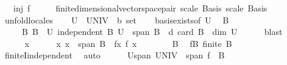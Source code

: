\begin{isabellebody}
\ \ \ {\isachardoublequoteopen}inj\ f{\isachardoublequoteclose}\isanewline
%
\isadelimproof
%
\endisadelimproof
%
\isatagproof
{}\isamarkupfalse%
\ {\isacharminus}{\kern0pt}\isanewline
\ \ \isamarkupfalse%
\ finite{\isacharunderscore}{\kern0pt}dimensional{\isacharunderscore}{\kern0pt}vector{\isacharunderscore}{\kern0pt}space{\isacharunderscore}{\kern0pt}pair\ scale\ Basis\ scale\ Basis\ \isamarkupfalse%
\ unfold{\isacharunderscore}{\kern0pt}locales\isanewline
\ \ \isamarkupfalse%
\ {\isacharquery}{\kern0pt}U\ {\isacharequal}{\kern0pt}\ {\isachardoublequoteopen}UNIV\ {\isacharcolon}{\kern0pt}{\isacharcolon}{\kern0pt}\ {\isacharprime}{\kern0pt}b\ set{\isachardoublequoteclose}\isanewline
\ \ \isamarkupfalse%
\ basis{\isacharunderscore}{\kern0pt}exists{\isacharbrackleft}{\kern0pt}of\ {\isacharquery}{\kern0pt}U{\isacharbrackright}{\kern0pt}\ \isamarkupfalse%
\ B\isanewline
\ \ \ \ \ B{\isacharcolon}{\kern0pt}\ {\isachardoublequoteopen}B\ {\isasymsubseteq}\ {\isacharquery}{\kern0pt}U{\isachardoublequoteclose}\ {\isachardoublequoteopen}independent\ B{\isachardoublequoteclose}\ {\isachardoublequoteopen}{\isacharquery}{\kern0pt}U\ {\isasymsubseteq}\ span\ B{\isachardoublequoteclose}\ \ d{\isacharcolon}{\kern0pt}\ {\isachardoublequoteopen}card\ B\ {\isacharequal}{\kern0pt}\ dim\ {\isacharquery}{\kern0pt}U{\isachardoublequoteclose}\isanewline
\ \ \ \ \isamarkupfalse%
\ blast\isanewline
\ \ \isacommand{{\isacharbraceleft}{\kern0pt}}\isamarkupfalse%
\isanewline
\ \ \ \ \isamarkupfalse%
\ x\isanewline
\ \ \ \ \isamarkupfalse%
\ x{\isacharcolon}{\kern0pt}\ {\isachardoublequoteopen}x\ {\isasymin}\ span\ B{\isachardoublequoteclose}\ \ fx{\isacharcolon}{\kern0pt}\ {\isachardoublequoteopen}f\ x\ {\isacharequal}{\kern0pt}\ {}{\isachardoublequoteclose}\isanewline
\ \ \ \ \isamarkupfalse%
\ B{\isacharparenleft}{\kern0pt}{}{\isacharparenright}{\kern0pt}\ \isamarkupfalse%
\ fB{\isacharcolon}{\kern0pt}\ {\isachardoublequoteopen}finite\ B{\isachardoublequoteclose}\isanewline
\ \ \ \ \ \ \isamarkupfalse%
\ finiteI{\isacharunderscore}{\kern0pt}independent\ \isamarkupfalse%
\ auto\isanewline
\ \ \ \ \isamarkupfalse%
\ Uspan{\isacharcolon}{\kern0pt}\ {\isachardoublequoteopen}UNIV\ {\isasymsubseteq}\ span\ {\isacharparenleft}{\kern0pt}f\ {\isacharbackquote}{\kern0pt}\ B{\isacharparenright}{\kern0pt}{\isachardoublequoteclose}\isanewline

\end{isabellebody}
